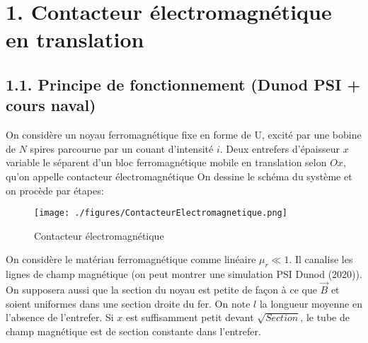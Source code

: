 \documentclass[french, a4paper, 10pt, twocolumn, landscape]{article}
\begin{document}
\section*{1. Contacteur électromagnétique en translation}

\subsection*{1.1. Principe de fonctionnement (Dunod PSI + cours naval)}

On considère un noyau ferromagnétique fixe en forme de U, excité par une bobine de $N$ spires parcourue par un couant d'intensité $i$. Deux entrefers d'épaisseur $x$ variable le séparent d'un bloc ferromagnétique mobile en translation selon $Ox$, qu'on appelle \og{}contacteur électromagnétique\fg{}\medskip
On dessine le schéma du système et on procède par étapes:

\begin{figure}[ht]
    \centering
    \texttt{[image: ./figures/ContacteurElectromagnetique.png]}
    \caption{Contacteur électromagnétique}
\end{figure} 

On considère le matériau  ferromagnétique comme linéaire $\mu_r\ll 1$. Il canalise les lignes de champ magnétique (on peut montrer une simulation PSI Dunod (2020)). On supposera aussi que la section du noyau est petite de façon à ce que $\vec{B}$ et  soient uniformes dans une section droite du fer. On note $l$ la longueur moyenne en l'absence de l'entrefer. Si $x$ est suffisamment petit devant $\sqrt{Section}$, le tube de champ magnétique est de section constante dans l'entrefer.
\end{document}
